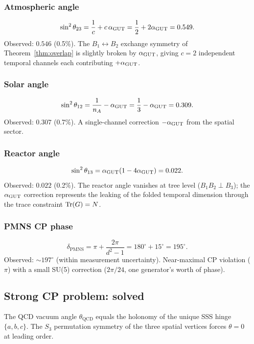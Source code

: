 \subsubsection{Atmospheric angle}
\begin{equation}
\sin^2\theta_{23} = \frac{1}{c} + c\,\alpha_{\mathrm{GUT}} = \frac{1}{2} + 2\alpha_{\mathrm{GUT}} = 0.549.
\end{equation}
Observed: $0.546$ (0.5\%). The $B_1 \leftrightarrow B_2$ exchange symmetry of Theorem~\ref{thm:overlap} is slightly broken by $\alpha_{\mathrm{GUT}}$, giving $c = 2$ independent temporal channels each contributing $+\alpha_{\mathrm{GUT}}$.

\subsubsection{Solar angle}
\begin{equation}
\sin^2\theta_{12} = \frac{1}{n_A} - \alpha_{\mathrm{GUT}} = \frac{1}{3} - \alpha_{\mathrm{GUT}} = 0.309.
\end{equation}
Observed: $0.307$ (0.7\%). A single-channel correction $-\alpha_{\mathrm{GUT}}$ from the spatial sector.

\subsubsection{Reactor angle}
\begin{equation}
\sin^2\theta_{13} = \alpha_{\mathrm{GUT}}(1 - 4\alpha_{\mathrm{GUT}}) = 0.022.
\end{equation}
Observed: $0.022$ (0.2\%). The reactor angle vanishes at tree level ($B_1 B_2 \perp B_3$); the $\alpha_{\mathrm{GUT}}$ correction represents the leaking of the folded temporal dimension through the trace constraint $\operatorname{Tr}(G) = N$.

\subsubsection{PMNS CP phase}
\begin{equation}
\delta_\text{PMNS} = \pi + \frac{2\pi}{d^2 - 1} = 180^\circ + 15^\circ = 195^\circ.
\end{equation}
Observed: $\sim 197^\circ$ (within measurement uncertainty). Near-maximal CP violation ($\pi$) with a small SU(5) correction ($2\pi/24$, one generator's worth of phase).

\subsection{Strong CP problem: solved}

The QCD vacuum angle $\theta_\text{QCD}$ equals the holonomy of the unique SSS hinge $\{a, b, c\}$. The $S_3$ permutation symmetry of the three spatial vertices forces $\theta = 0$ at leading order.


